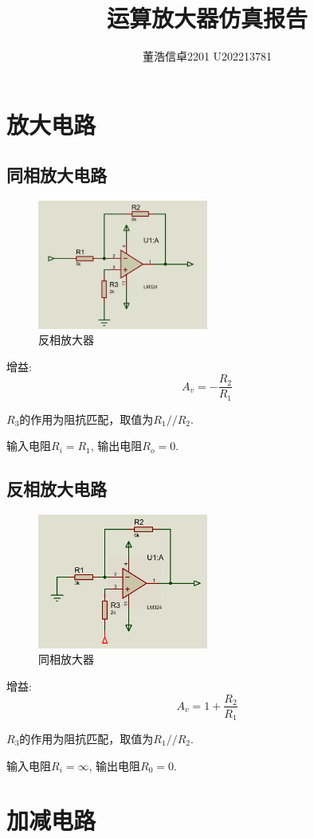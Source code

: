 \documentclass[a4paper,11pt,UTF8]{article}
\title{运算放大器仿真报告}
\author{董浩\quad 信卓2201 \quad U202213781}
\date{}
\begin{document}
\maketitle
\section{放大电路}
\subsection{同相放大电路}
\begin{figure}[H]
	\centering
	\includegraphics[width=0.5\textwidth]{反相放大器}
	\caption{反相放大器}
\end{figure}
增益:
$$A_v = - \frac{R_2}{R_1}$$

$R_3$的作用为阻抗匹配，取值为$R_1//R_2$.

输入电阻$R_i=R_1$, 输出电阻$R_o = 0$.
\subsection{反相放大电路}
\begin{figure}[H]
	\centering
	\includegraphics[width=0.5\textwidth]{同相放大器}
	\caption{同相放大器}
\end{figure}
增益:
$$A_v=1+\frac{R_2}{R_1}$$

$R_3$的作用为阻抗匹配，取值为$R_1//R_2$.

输入电阻$R_i=\infty$, 输出电阻$R_0 = 0$.

\section{加减电路}
\end{document}
